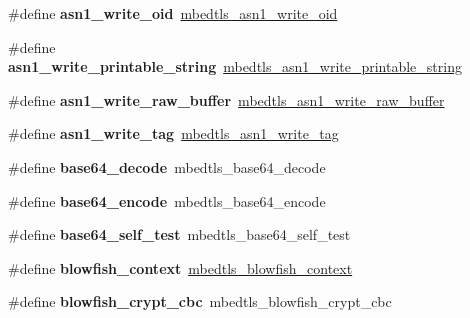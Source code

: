 \begin{DoxyCompactItemize}
\#define {\bfseries asn1\+\_\+write\+\_\+oid}~\mbox{\hyperlink{asn1write_8h_ab437fb4183494e4c9cf4b6e15ca236d6}{mbedtls\+\_\+asn1\+\_\+write\+\_\+oid}}
\item 
\mbox{\label{compat-1_83_8h_ab2a974e3e26eacc6013212a7e6886fa7}} 
\#define {\bfseries asn1\+\_\+write\+\_\+printable\+\_\+string}~\mbox{\hyperlink{asn1write_8h_a400af5e542195c14533baf2f377d31d1}{mbedtls\+\_\+asn1\+\_\+write\+\_\+printable\+\_\+string}}
\item 
\mbox{\label{compat-1_83_8h_a619517bd574509a6dc72ab084bdfc23d}} 
\#define {\bfseries asn1\+\_\+write\+\_\+raw\+\_\+buffer}~\mbox{\hyperlink{asn1write_8h_a1ecd132a57faf95c61423dc9cdc30143}{mbedtls\+\_\+asn1\+\_\+write\+\_\+raw\+\_\+buffer}}
\item 
\mbox{\label{compat-1_83_8h_a3b0f4dd261fd32b4c148d64488696a9d}} 
\#define {\bfseries asn1\+\_\+write\+\_\+tag}~\mbox{\hyperlink{asn1write_8h_a2247b80bd02e2981dc26ce62ffbb1859}{mbedtls\+\_\+asn1\+\_\+write\+\_\+tag}}
\item 
\mbox{\label{compat-1_83_8h_a99be317a0c7a98be79a52ee3d1968310}} 
\#define {\bfseries base64\+\_\+decode}~mbedtls\+\_\+base64\+\_\+decode
\item 
\mbox{\label{compat-1_83_8h_ab558f8b931e57e22623bb0a35c0bc56d}} 
\#define {\bfseries base64\+\_\+encode}~mbedtls\+\_\+base64\+\_\+encode
\item 
\mbox{\label{compat-1_83_8h_a428c92a84f3a409ca88e981b886b6919}} 
\#define {\bfseries base64\+\_\+self\+\_\+test}~mbedtls\+\_\+base64\+\_\+self\+\_\+test
\item 
\mbox{\label{compat-1_83_8h_a9bdd9c6624727bb7af5776f9d2dcce20}} 
\#define {\bfseries blowfish\+\_\+context}~\mbox{\hyperlink{structmbedtls__blowfish__context}{mbedtls\+\_\+blowfish\+\_\+context}}
\item 
\mbox{\label{compat-1_83_8h_ad62fff7f7449485c06953a8b48491723}} 
\#define {\bfseries blowfish\+\_\+crypt\+\_\+cbc}~mbedtls\+\_\+blowfish\+\_\+crypt\+\_\+cbc
\item 
\mbox{\label{compat-1_83_8h_a6efa54a6c021a34a07f539aa2ac3255f}} 

\end{DoxyCompactItemize}
